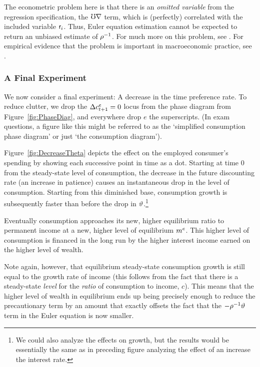 \documentclass{handout}
\begin{document}
The econometric problem here is that there is an {\it omitted
variable} from the regression specification, the $\mho \nabla$ term, which is (perfectly) correlated with the included
variable $\mathsf{r}_{i}$.  Thus, Euler equation estimation cannot be expected to
return an unbiased estimate of $\rho^{-1}$.  For much more on this
problem, see \cite{carroll:death}.  For empirical evidence
that the problem is important in macroeconomic practice, see \cite{ParkerPrestonPrecaution}.

\subsubsection{A Final Experiment}
We now consider a final experiment: A decrease in the time preference
rate.  To reduce clutter, we drop the $\Delta c^{e}_{t+1}=0$ locus from the 
phase diagram from Figure~\ref{fig:PhaseDiag}, and everywhere drop $e$ the superscripts.  
(In exam questions, a figure like this might be referred to as the `simplified consumption phase diagram' or just
`the consumption diagram').

Figure~\ref{fig:DecreaseTheta} depicts the effect on the 
employed consumer's spending by
showing each successive point in time as a dot.  
Starting at time 0 from the steady-state level of consumption, the
decrease in the future discounting rate (an increase in patience) causes
an instantaneous drop in the level of consumption.  Starting from this diminished 
base, consumption growth is subsequently faster than before the drop in $\vartheta$.\footnote{We could also analyze the effects on growth, but the
  results would be essentially the same as in preceding figure
  analyzing the effect of an increase the interest rate.}

Eventually consumption approaches its new, higher equilibrium ratio
to permanent income at a new, higher level of equilibrium $m^{e}$.  This
higher level of consumption is financed in the long run by the higher
interest income earned on the higher level of wealth.

Note again, however, that equilibrium steady-state 
consumption growth is still equal to the growth rate of income (this follows
from the fact that there is a steady-state {\it level} for the {\it
  ratio} of consumption to income, $c$).  This means that the higher
level of wealth in equilibrium ends up being precisely enough to
reduce the precautionary term by an amount that exactly offsets the
fact that the $-\rho^{-1}\vartheta$ term in the Euler equation is now
smaller.
\end{document}
